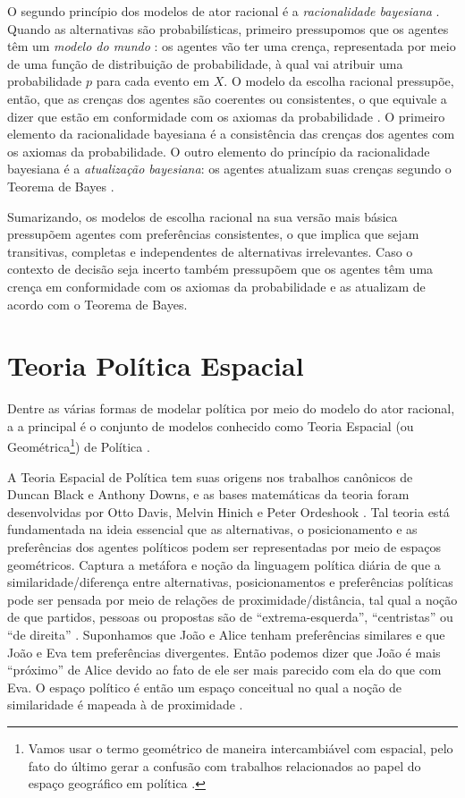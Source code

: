 O segundo princípio dos modelos de ator racional é a \textit{racionalidade
  bayesiana} \cite{gintis2016individuality}. Quando as alternativas são
probabilísticas, primeiro pressupomos que os agentes têm um \textit{modelo do
  mundo} \cite{acemoglu2011opinion}: os agentes vão ter uma crença, representada
por meio de uma função de distribuição de probabilidade, à qual vai atribuir uma
probabilidade \(p\) para cada evento em \(X\). O modelo da escolha racional
pressupõe, então, que as crenças dos agentes são coerentes ou consistentes, o
que equivale a dizer que estão em conformidade com os axiomas da probabilidade
\cite{jackman2009bayesian}. O primeiro elemento da racionalidade bayesiana é a
consistência das crenças dos agentes com os axiomas da probabilidade. O outro
elemento do princípio da racionalidade bayesiana é a \textit{atualização
  bayesiana}: os agentes atualizam suas crenças segundo o Teorema de Bayes
\cite[p.104]{gintis2016individuality}.

Sumarizando, os modelos de escolha racional na sua versão mais básica pressupõem
agentes com preferências consistentes, o que implica que sejam transitivas,
completas e independentes de alternativas irrelevantes. Caso o contexto de
decisão seja incerto também pressupõem que os agentes têm uma crença em
conformidade com os axiomas da probabilidade  e as atualizam de acordo com o
Teorema de Bayes.


\section{Teoria Política Espacial}

Dentre as várias formas de modelar política por meio do modelo do ator racional,
a a principal é o conjunto de modelos conhecido como Teoria Espacial (ou
Geométrica\footnote{Vamos usar o termo geométrico de maneira intercambiável com
  espacial, pelo fato do último gerar a confusão com trabalhos relacionados ao
  papel do espaço geográfico em política \cite{ward2002spatial,
    poole2005spatial}.}) de Política \cite{van2005political}.

A Teoria Espacial de Política tem suas origens nos trabalhos canônicos de Duncan
Black e Anthony Downs, e as bases matemáticas da teoria foram desenvolvidas por
Otto Davis, Melvin Hinich e Peter Ordeshook \cite{black1958theory,
  downs1957economic, poole2005spatial, miller2015spatial}. Tal teoria está
fundamentada na ideia essencial que as alternativas, o posicionamento e as
preferências dos agentes políticos podem ser representadas por meio de espaços
geométricos. Captura a metáfora e noção da linguagem política diária de que a
similaridade/diferença entre alternativas, posicionamentos e preferências
políticas pode ser pensada por meio de relações de proximidade/distância, tal
qual a noção de que partidos, pessoas ou propostas são de ``extrema-esquerda'',
``centristas'' ou ``de direita'' \cite{munger2015choosing}. Suponhamos que João e
Alice tenham preferências similares e que João e Eva tem preferências
divergentes. Então podemos dizer que João é mais ``próximo'' de Alice devido ao fato
de ele ser mais parecido com ela do que com Eva. O espaço político é então um
espaço conceitual no qual a noção de similaridade é mapeada à de proximidade
\cite{laver2014measuring}.


